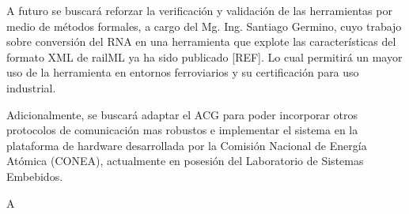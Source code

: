 A futuro se buscará reforzar la verificación y validación de las herramientas por medio de métodos formales, a cargo del Mg. Ing. Santiago Germino, cuyo trabajo sobre conversión del RNA en una herramienta que explote las características del formato XML de railML ya ha sido publicado [REF]. Lo cual permitirá un mayor uso de la herramienta en entornos ferroviarios y su certificación para uso industrial.

Adicionalmente, se buscará adaptar el ACG para poder incorporar otros protocolos de comunicación mas robustos e implementar el sistema en la plataforma de hardware desarrollada por la Comisión Nacional de Energía Atómica (CONEA), actualmente en posesión del Laboratorio de Sistemas Embebidos.

A\\
\cite{Paper_1}\cite{Paper_3}\cite{Paper_6}\cite{Paper_7}\cite{Paper_10}\cite{Paper_11}\cite{Paper_14}\cite{Paper_16}\cite{Paper_18}\cite{Paper_20}\\
\cite{Paper_27}\cite{Paper_33}\cite{Paper_39}\cite{Paper_40}\cite{Paper_44}\cite{Paper_45}\cite{Paper_48}\cite{Paper_50}\cite{Paper_51}\cite{Paper_52}\\
\cite{Paper_55}\cite{Paper_56}\cite{Paper_57}\cite{Paper_58}\cite{Paper_59}\cite{Paper_60}\cite{Paper_61}\cite{Paper_62}\cite{Paper_63}\cite{Paper_67}\\
\cite{Paper_69}\cite{Paper_85}\cite{Paper_90}\cite{Paper_91}\cite{Paper_92}\cite{Paper_93}\cite{Paper_104}\cite{Paper_105}\cite{Paper_106}\cite{Paper_108}\\
\cite{Paper_110}\cite{Paper_111}\cite{Paper_113}\cite{Paper_119}\cite{Paper_121}\cite{Paper_129}\cite{Paper_134}\cite{Paper_137}\cite{Paper_139}\cite{Paper_145}\\
\cite{Paper_147}\cite{Paper_148}\cite{Paper_152}\cite{Paper_153}\cite{Paper_166}\cite{Paper_167}\cite{Paper_172}\cite{Paper_173}\cite{Paper_174}\cite{Paper_177}\cite{Paper_178}\\

